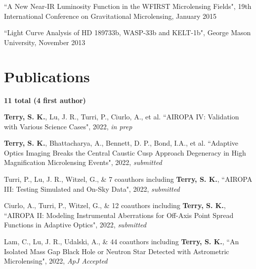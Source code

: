 \documentclass[margin,line]{cv}
\begin{document}
\begin{resume}
\begin{etaremune}
\item ``A New Near-IR Luminosity Function in the WFIRST Microlensing Fields", 19th International Conference on Gravitational Microlensing, January 2015

\item ``Light Curve Analysis of HD 189733b, WASP-33b and KELT-1b", George Mason University, November 2013 \\

\end{etaremune}

\section{\sc Publications}
\textbf{11 total (4 first author)}\\
\begin{etaremune}

\item \textbf{Terry, S. K.}, Lu, J. R., Turri, P., Ciurlo, A., et al. ``AIROPA IV: Validation with Various Science Cases", 2022, \textit{in prep}

\item \textbf{Terry, S. K.}, Bhattacharya, A., Bennett, D. P., Bond, I.A., et al. ``Adaptive Optics Imaging Breaks the Central Caustic Cusp Approach Degeneracy in High Magnification Microlensing Events", 2022, \textit{submitted}

\item Turri, P., Lu, J. R., Witzel, G., \& 7 coauthors including \textbf{Terry, S. K.}, ``AIROPA III: Testing Simulated and On-Sky Data", 2022, \textit{submitted}

\item Ciurlo, A., Turri, P., Witzel, G., \& 12 coauthors including \textbf{Terry, S. K.}, ``AIROPA II: Modeling Instrumental Aberrations for Off-Axis Point Spread Functions in Adaptive Optics", 2022, \textit{submitted}

\item Lam, C., Lu, J. R., Udalski, A., \& 44 coauthors including {\bf Terry, S. K.}, ``An Isolated Mass Gap Black Hole or Neutron Star Detected with Astrometric Microlensing", 2022, \textit{ApJ Accepted}


\end{etaremune}
\end{resume}
\end{document}
